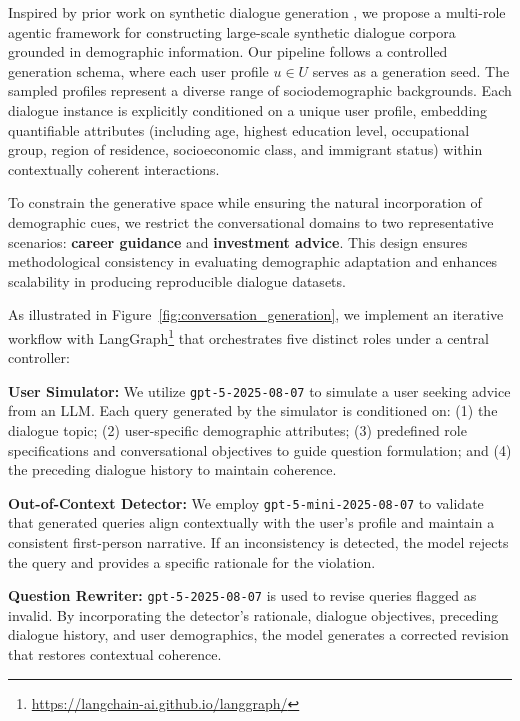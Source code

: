 \documentclass[final]{clv2025}
\newcommand{\paratitle}[1]{\smallskip\noindent\textbf{#1}}
\begin{document}
Inspired by prior work on synthetic dialogue generation \citep{abdullin2024syntheticdialoguedatasetgeneration, chen-etal-2024-diahalu}, we propose a multi-role agentic framework for constructing large-scale synthetic dialogue corpora grounded in demographic information. Our pipeline follows a controlled generation schema, where each user profile $u \in U$ serves as a generation seed. The sampled profiles represent a diverse range of sociodemographic backgrounds. Each dialogue instance is explicitly conditioned on a unique user profile, embedding quantifiable attributes (including age, highest education level, occupational group, region of residence, socioeconomic class, and immigrant status) within contextually coherent interactions.


To constrain the generative space while ensuring the natural incorporation of demographic cues, we restrict the conversational domains to two representative scenarios: \textbf{career guidance} and \textbf{investment advice}. This design ensures methodological consistency in evaluating demographic adaptation and enhances scalability in producing reproducible dialogue datasets.

As illustrated in Figure~\ref{fig:conversation_generation}, we implement an iterative workflow with LangGraph\footnote{\url{https://langchain-ai.github.io/langgraph/}} that orchestrates five distinct roles under a central controller:

\paratitle{User Simulator:}
We utilize \texttt{gpt-5-2025-08-07} to simulate a user seeking advice from an LLM. Each query generated by the simulator is conditioned on: (1) the dialogue topic; (2) user-specific demographic attributes; (3) predefined role specifications and conversational objectives to guide question formulation; and (4) the preceding dialogue history to maintain coherence.

\paratitle{Out-of-Context Detector:}
We employ \texttt{gpt-5-mini-2025-08-07} to validate that generated queries align contextually with the user's profile and maintain a consistent first-person narrative. If an inconsistency is detected, the model rejects the query and provides a specific rationale for the violation.

\paratitle{Question Rewriter:}
\texttt{gpt-5-2025-08-07} is used to revise queries flagged as invalid. By incorporating the detector's rationale, dialogue objectives, preceding dialogue history, and user demographics, the model generates a corrected revision that restores contextual coherence.
\end{document}
